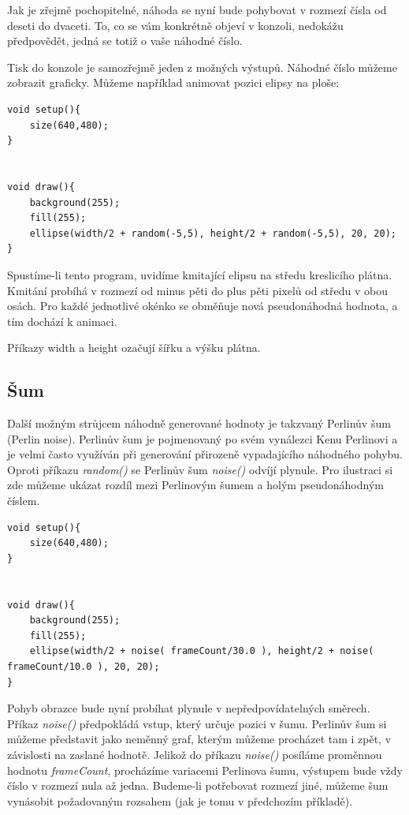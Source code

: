 \documentclass[10pt]{book}
\newcommand{\pododdil}[1]{\subsection{#1}\index{#1}\label{#1}}
\newcommand{\vyraz}[1]{\textit{\gls{#1}}\index{#1}\label{#1}}
\begin{document}
Jak je zřejmě pochopitelné, náhoda se nyní bude pohybovat v rozmezí čísla od deseti do dvaceti. To, co se vám konkrétně objeví v konzoli, nedokážu předpovědět, jedná se totiž o vaše náhodné číslo.

Tisk do konzole je samozřejmě jeden z možných výstupů. Náhodné číslo můžeme zobrazit graficky. Můžeme například animovat pozici elipsy na ploše:

\begin{lstlisting}
void setup(){
	size(640,480);
}


void draw(){
	background(255);
	fill(255);
	ellipse(width/2 + random(-5,5), height/2 + random(-5,5), 20, 20);
}
\end{lstlisting}


Spustíme-li tento program, uvidíme kmitající elipsu na středu kreslicího plátna. Kmitání probíhá v rozmezí od minus pěti do plus pěti pixelů od středu v obou osách. Pro každé jednotlivé okénko se obměňuje nová pseudonáhodná hodnota, a tím dochází k animaci.

Příkazy width a height ozačují šířku a výšku plátna.




\pododdil{Šum}

Další možným strůjcem náhodně generované hodnoty je takzvaný Perlinův šum (Perlin noise). Perlinův šum je pojmenovaný po svém vynálezci Kenu Perlinovi a je velmi často využíván při generování přirozeně vypadajícího náhodného pohybu. Oproti příkazu \vyraz{random()} se Perlinův šum \vyraz{noise()} odvíjí plynule. Pro ilustraci si zde můžeme ukázat rozdíl mezi Perlinovým šumem a holým pseudonáhodným číslem.



\begin{lstlisting}
void setup(){
	size(640,480);
}


void draw(){
	background(255);
	fill(255);
	ellipse(width/2 + noise( frameCount/30.0 ), height/2 + noise( frameCount/10.0 ), 20, 20);
}
\end{lstlisting}

Pohyb obrazce bude nyní probíhat plynule v nepředpovídatelných směrech. Příkaz \vyraz{noise()} předpokládá vstup, který určuje pozici v šumu. Perlinův šum si můžeme představit jako neměnný graf, kterým můžeme procházet tam i zpět, v závislosti na zaslané hodnotě. Jelikož do příkazu \vyraz{noise()} posíláme proměnnou hodnotu \vyraz{frameCount}, procházíme variacemi Perlinova šumu, výstupem bude vždy číslo v rozmezí nula až jedna. Budeme-li potřebovat rozmezí jiné, můžeme šum vynásobit požadovaným rozsahem (jak je tomu v předchozím příkladě).
\end{document}
